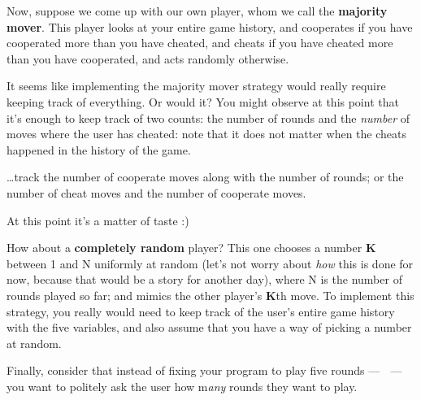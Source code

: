 \documentclass[
  letterpaper,
  DIV=11,
  numbers=noendperiod]{scrreprt}
\begin{document}
Now, suppose we come up with our own player, whom we call the
\textbf{majority mover}. This player looks at your entire game history,
and cooperates if you have cooperated more than you have cheated, and
cheats if you have cheated more than you have cooperated, and acts
randomly otherwise.

It seems like implementing the majority mover strategy would really
require keeping track of everything. Or would it? You might observe at
this point that it's enough to keep track of two counts: the number of
rounds and the \emph{number} of moves where the user has cheated: note
that it does not matter when the cheats happened in the history of the
game.

\begin{tcolorbox}[standard jigsaw,toptitle=1mm, titlerule=0mm, bottomtitle=1mm, title=\textcolor{quarto-callout-note-color}{\faInfo}\hspace{0.5em}{You could also\ldots{}}, coltitle=black, colback=white, toprule=.15mm, colframe=quarto-callout-note-color-frame, arc=.35mm, rightrule=.15mm, opacityback=0, left=2mm, leftrule=.75mm, colbacktitle=quarto-callout-note-color!10!white, opacitybacktitle=0.6, bottomrule=.15mm]
\ldots track the number of cooperate moves along with the number of
rounds; or the number of cheat moves and the number of cooperate moves.

At this point it's a matter of taste :)
\end{tcolorbox}

How about a \textbf{completely random} player? This one chooses a number
\textbf{K} between 1 and N uniformly at random (let's not worry about
\emph{how} this is done for now, because that would be a story for
another day), where N is the number of rounds played so far; and mimics
the other player's \textbf{K}th move. To implement this strategy, you
really would need to keep track of the user's entire game history with
the five variables, and also assume that you have a way of picking a
number at random.

Finally, consider that instead of fixing your program to play five
rounds --- 🥱 --- you want to politely ask the user how m\emph{any
}rounds they want to play.
\end{document}
